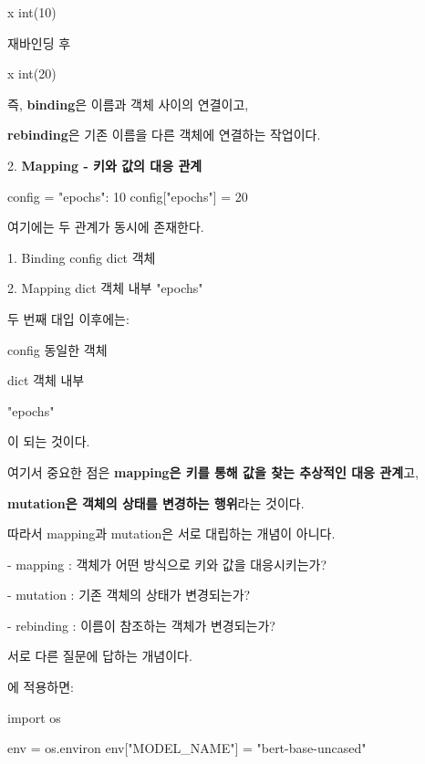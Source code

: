 \begin{dhksmry}[centered]
x \ra int(10)

재바인딩 후

x \ra int(20)
\end{dhksmry}

즉, \textbf{binding}은 이름과 객체 사이의 연결이고,

\textbf{rebinding}은 기존 이름을 다른 객체에 연결하는 작업이다.

2. \textbf{Mapping - 키와 값의 대응 관계}

\begin{dhkcode}
config = {"epochs": 10}
config["epochs"] = 20
\end{dhkcode}

여기에는 두 관계가 동시에 존재한다.

\begin{dhksmry}
    1. Binding
        config \ra dict 객체

    2. Mapping
        dict 객체 내부
        "epochs" 
\end{dhksmry}

두 번째 대입 이후에는:

\begin{dhksmry}[centered]
config \ra 동일한 객체

dict 객체 내부

"epochs" 
\end{dhksmry}

이 되는 것이다.

여기서 중요한 점은 \textbf{mapping은 키를 통해 값을 찾는 추상적인 대응 관계}고,

\textbf{mutation은 객체의 상태를 변경하는 행위}라는 것이다.

따라서 mapping과 mutation은 서로 대립하는 개념이 아니다.

\begin{dhksmry}
    - mapping : 객체가 어떤 방식으로 키와 값을 대응시키는가?

    - mutation : 기존 객체의 상태가 변경되는가?

    - rebinding : 이름이 참조하는 객체가 변경되는가?
\end{dhksmry}

서로 다른 질문에 답하는 개념이다.

에 적용하면:

\begin{dhkcode}
import os

env = os.environ
env["MODEL_NAME"] = "bert-base-uncased"
\end{dhkcode}

